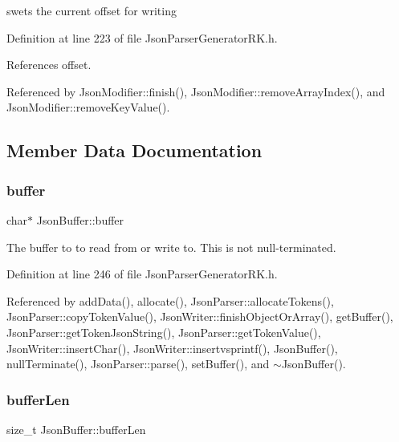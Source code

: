 swets the current offset for writing 



Definition at line 223 of file Json\+Parser\+Generator\+R\+K.\+h.



References offset.



Referenced by Json\+Modifier\+::finish(), Json\+Modifier\+::remove\+Array\+Index(), and Json\+Modifier\+::remove\+Key\+Value().



\subsection{Member Data Documentation}
\mbox{\label{class_json_buffer_aaee27fe51d12d68bd6031df3bc78b6b5}} 
\subsubsection{\texorpdfstring{buffer}{buffer}}
{\footnotesize\ttfamily char$\ast$ Json\+Buffer\+::buffer\hspace{0.3cm}{\ttfamily [protected]}}



The buffer to to read from or write to. This is not null-\/terminated. 



Definition at line 246 of file Json\+Parser\+Generator\+R\+K.\+h.



Referenced by add\+Data(), allocate(), Json\+Parser\+::allocate\+Tokens(), Json\+Parser\+::copy\+Token\+Value(), Json\+Writer\+::finish\+Object\+Or\+Array(), get\+Buffer(), Json\+Parser\+::get\+Token\+Json\+String(), Json\+Parser\+::get\+Token\+Value(), Json\+Writer\+::insert\+Char(), Json\+Writer\+::insertvsprintf(), Json\+Buffer(), null\+Terminate(), Json\+Parser\+::parse(), set\+Buffer(), and $\sim$\+Json\+Buffer().

\mbox{\label{class_json_buffer_af06130f43f71623ea6afe049c846e52b}} 
\subsubsection{\texorpdfstring{buffer\+Len}{bufferLen}}
{\footnotesize\ttfamily size\+\_\+t Json\+Buffer\+::buffer\+Len\hspace{0.3cm}{\ttfamily [protected]}}




